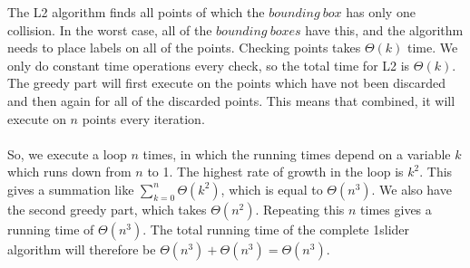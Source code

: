 \documentclass[crop=false,a4paper,oneside,11pt]{article}
\begin{document}
The L2 algorithm finds all points of which the $bounding \ box$ has only one collision. In the worst case, all of the $bounding \ boxes$ have this, and the algorithm needs to place labels on all of the points. Checking points takes $\Theta(k)$ time. We only do constant time operations every check, so the total time for L2 is $\Theta(k)$. \\
The greedy part will first execute on the points which have not been discarded and then again for all of the discarded points. This means that combined, it will execute on $n$ points every iteration.  
\\ \\
So, we execute a loop $n$ times, in which the running times depend on a variable $k$ which runs down from $n$ to 1. The highest rate of growth in the loop is $k^2$. This gives a summation like $\sum_{k=0}^n \Theta(k^2)$, which is equal to $\Theta(n^3)$. We also have the second greedy part, which takes $\Theta(n^2)$. Repeating this $n$ times gives a running time of $\Theta(n^3)$.
The total running time of the complete 1slider algorithm will therefore be $\Theta(n^3) + \Theta(n^3) = \Theta(n^3)$.
\end{document}
